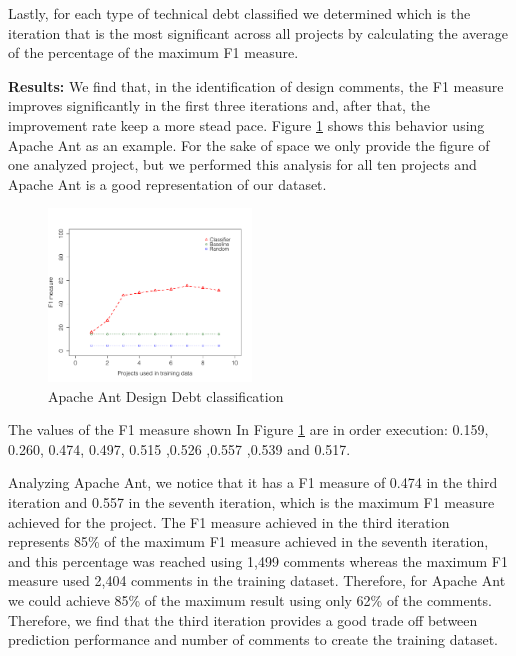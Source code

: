 Lastly, for each type of technical debt classified we determined which is the iteration that is the most significant across all projects by calculating the average of the percentage of the maximum F1 measure.

\vspace{1mm}
\noindent \textbf{Results:} We find that, in the identification of design \SATD comments, the F1 measure improves significantly in the first three iterations and, after that, the improvement rate keep a more stead pace. Figure \ref{fig:design_ant_result} shows this behavior using Apache Ant as an example. For the sake of space we only provide the figure of one analyzed project, but we performed this analysis for all ten projects and Apache Ant is a good representation of our dataset. 

\begin{figure}[thb!]
  \centering
  \includegraphics[width = 0.48\textwidth]{figures/design_ant.pdf}
  \vspace{-3mm}
  \caption{Apache Ant Design Debt classification}
  \label{fig:design_ant_result}
\end{figure}

The values of the F1 measure shown In Figure \ref{fig:design_ant_result} are in order execution: 0.159, 0.260, 0.474, 0.497, 0.515 ,0.526 ,0.557 ,0.539 and 0.517.

Analyzing Apache Ant, we notice that it has a F1 measure of 0.474 in the third iteration and 0.557 in the seventh iteration, which is the maximum F1 measure achieved for the project. The F1 measure achieved in the third iteration represents 85\% of the maximum F1 measure achieved in the seventh iteration, and this percentage was reached using 1,499 comments whereas the maximum F1 measure used 2,404 comments in the training dataset. Therefore, for Apache Ant we could achieve 85\% of the maximum result using only 62\% of the comments. Therefore, we find that the third iteration provides a good trade off between prediction performance and number of comments to create the training dataset.

